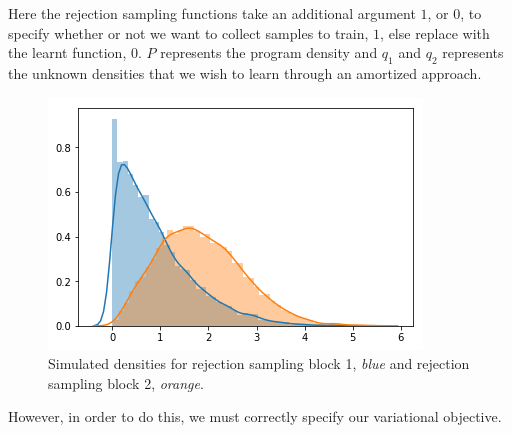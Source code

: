 \documentclass{article}
\begin{document}
Here the rejection sampling functions take an additional argument $1$, or $0$,
to specify whether or not we want to collect samples to train, $1$, else replace with 
the learnt function, $0$. $P$ represents the program density and $q_{1}$ and $q_{2}$ represents 
the unknown densities that we wish to learn through an amortized approach. 

\begin{figure}
  \centering
  \includegraphics{rs_plots.png}
  \caption{ Simulated densities for rejection sampling block 1, \emph{blue} and rejection
  sampling block 2, \emph{orange}.}
  \label{fig:rs_simulated}
\end{figure}
However, in order to do this, we must correctly specify our variational objective.
\end{document}
